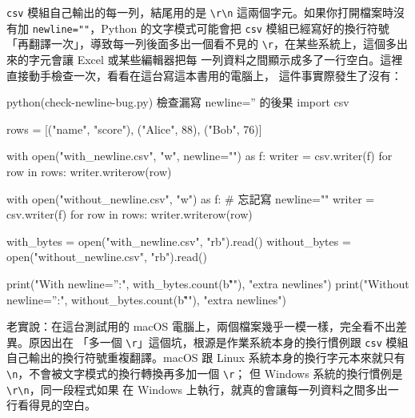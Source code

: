 \texttt{csv} 模組自己輸出的每一列，結尾用的是 \texttt{\textbackslash r\textbackslash n}
這兩個字元。如果你打開檔案時沒有加 \texttt{newline=""}，Python 的文字模式可能會把
\texttt{csv} 模組已經寫好的換行符號「再翻譯一次」，導致每一列後面多出一個看不見的
\texttt{\textbackslash r}，在某些系統上，這個多出來的字元會讓 Excel 或某些編輯器把每
一列資料之間顯示成多了一行空白。這裡直接動手檢查一次，看看在這台寫這本書用的電腦上，
這件事實際發生了沒有：

\begin{example}{python}{(check-newline-bug.py) 檢查漏寫 newline='' 的後果}
import csv

rows = [("name", "score"), ("Alice", 88), ("Bob", 76)]

with open("with_newline.csv", "w", newline="") as f:
    writer = csv.writer(f)
    for row in rows:
        writer.writerow(row)

with open("without_newline.csv", "w") as f:          # 忘記寫 newline=""
    writer = csv.writer(f)
    for row in rows:
        writer.writerow(row)

with_bytes = open("with_newline.csv", "rb").read()
without_bytes = open("without_newline.csv", "rb").read()

print("With newline='':", with_bytes.count(b"\r\r\n"), "extra newlines")
print("Without newline='':", without_bytes.count(b"\r\r\n"), "extra newlines")
\end{example}


老實說：在這台測試用的 macOS 電腦上，兩個檔案幾乎一模一樣，完全看不出差異。原因出在
「多一個 \texttt{\textbackslash r}」這個坑，根源是作業系統本身的換行慣例跟 \texttt{csv}
模組自己輸出的換行符號重複翻譯。macOS 跟 Linux 系統本身的換行字元本來就只有
\texttt{\textbackslash n}，不會被文字模式的換行轉換再多加一個 \texttt{\textbackslash r}；
但 Windows 系統的換行慣例是 \texttt{\textbackslash r\textbackslash n}，同一段程式如果
在 Windows 上執行，就真的會讓每一列資料之間多出一行看得見的空白。


